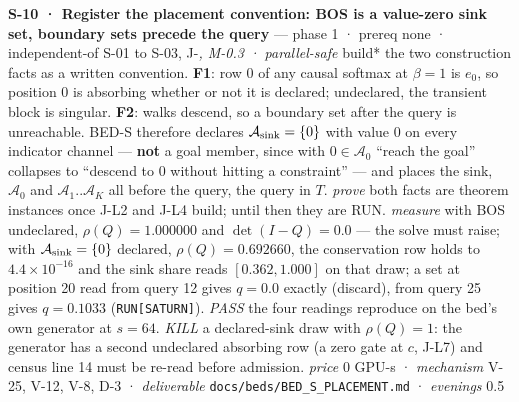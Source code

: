 \documentclass[11pt,a4paper]{article}
\newcounter{none}                 %
\theoremstyle{plain}
\theoremstyle{definition}
\theoremstyle{remark}
\begin{document}
\textbf{S-10 · Register the placement convention: BOS is a value-zero
sink set, boundary sets precede the query} --- phase 1 · prereq none ·
independent-of S-01 to S-03, J-\emph{, M-0.3 · parallel-safe }build* the
two construction facts as a written convention. \textbf{F1}: row 0 of
any causal softmax at \(\beta=1\) is \(e_0\), so position 0 is absorbing
whether or not it is declared; undeclared, the transient block is
singular. \textbf{F2}: walks descend, so a boundary set after the query
is unreachable. BED-S therefore declares
\(\mathcal{A}_{\rm sink}=\{0\}\) with value \(0\) on every indicator
channel --- \textbf{not} a goal member, since with \(0\in\mathcal{A}_0\)
``reach the goal'' collapses to ``descend to 0 without hitting a
constraint'' --- and places the sink, \(\mathcal{A}_0\) and
\(\mathcal{A}_1..\mathcal{A}_K\) all before the query, the query in
\(T\). \emph{prove} both facts are theorem instances once J-L2 and J-L4
build; until then they are RUN. \emph{measure} with BOS undeclared,
\(\rho(Q)=1.000000\) and \(\det(I-Q)=0.0\) --- the solve must raise;
with \(\mathcal{A}_{\rm sink}=\{0\}\) declared, \(\rho(Q)=0.692660\),
the conservation row holds to \(4.4\times10^{-16}\) and the sink share
reads \([0.362, 1.000]\) on that draw; a set at position 20 read from
query 12 gives \(q=0.0\) exactly (discard), from query 25 gives
\(q=0.1033\) (\texttt{RUN{[}SATURN{]}}). \emph{PASS} the four readings
reproduce on the bed's own generator at \(s=64\). \emph{KILL} a
declared-sink draw with \(\rho(Q)=1\): the generator has a second
undeclared absorbing row (a zero gate at \(c\), J-L7) and census line 14
must be re-read before admission. \emph{price} \(0\) GPU-s ·
\emph{mechanism} V-25, V-12, V-8, D-3 · \emph{deliverable}
\texttt{docs/beds/BED\_S\_PLACEMENT.md} · \emph{evenings} 0.5
\end{document}
